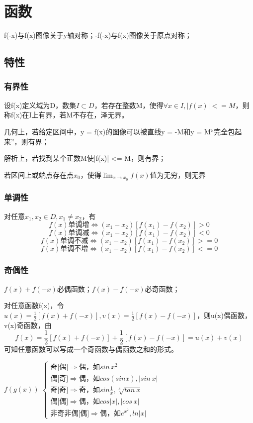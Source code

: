 
\chapter{函数}

f(-x)与f(x)图像关于y轴对称；-f(-x)与f(x)图像关于原点对称；

\section{特性}

\subsection{有界性}

设f(x)定义域为D，数集\(I \subset D\)，若存在整数M，使得\(\forall x \in I, |f(x)| <= M\)，则称f(x)在I上有界，若M不存在，泽无界。

几何上，若给定区间中，y = f(x)的图像可以被直线y = -M和y = M“完全包起来”，则有界；

解析上，若找到某个正数M使|f(x)| <= M，则有界；

若区间上或端点存在点\(x_0\)，使得\(\lim_{x \to x_0} f(x)\)值为无穷，则无界


\subsection{单调性}

对任意\(x_1, x_2 \in D, x_1 \neq x_2\)，有
\[f(x)\text{单调增} \Leftrightarrow (x_1 - x_2)[f(x_1) - f(x_2)] > 0\]
\[f(x)\text{单调减} \Leftrightarrow (x_1 - x_2)[f(x_1) - f(x_2)] < 0\]
\[f(x)\text{单调不减} \Leftrightarrow (x_1 - x_2)[f(x_1) - f(x_2)] >= 0\]
\[f(x)\text{单调不增} \Leftrightarrow (x_1 - x_2)[f(x_1) - f(x_2)] <= 0\]


\subsection{奇偶性}
\(f(x) + f(-x)\)必偶函数；\(f(x) - f(-x)\)必奇函数；

对任意函数f(x)，令\(u(x) = \frac{1}{2}[f(x) + f(-x)], v(x) = \frac{1}{2}[f(x) - f(-x)]\)，则u(x)偶函数，v(x)奇函数，由\[f(x) = \frac{1}{2}[f(x) + f(-x)] + \frac{1}{2}[f(x) - f(-x)] = u(x) + v(x)\]可知任意函数可以写成一个奇函数与偶函数之和的形式。

\(f(g(x))\)
\(
\begin{cases}
\text{奇[偶]}\Rightarrow \text{偶，如}sin\,x^2 \\ 
\text{偶[奇]}\Rightarrow \text{偶，如}cos(sinx),|sin\ x| \\ 
\text{奇[奇]}\Rightarrow \text{奇，如}sin\frac{1}{x}, \sqrt[3]{tan\ x} \\ 
\text{偶[偶]}\Rightarrow \text{偶，如}cos|x|, |cos\ x| \\ 
\text{非奇非偶[偶]}\Rightarrow \text{偶，如}e^{x^2}, ln|x|
\end{cases}
\)

